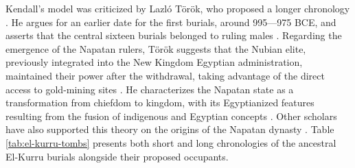 Kendall’s model was criticized by Lazló Török, who proposed a longer chronology \parencite[p.~298-309]{torokEmergenceKingdomKush1995, torokOriginNapatanState1999, torokTwoWorldsFrontier2009}. He argues for an earlier date for the first burials, around 995—975 BCE, and asserts that the central sixteen burials belonged to ruling males \parencite[p.~301]{torokTwoWorldsFrontier2009}. Regarding the emergence of the Napatan rulers, Török suggests that the Nubian elite, previously integrated into the New Kingdom Egyptian administration, maintained their power after the withdrawal, taking advantage of the direct access to gold-mining sites \parencite[p.~111-112]{torokKingdomKushHandbook1997}. He characterizes the Napatan state as a transformation from chiefdom to kingdom, with its Egyptianized features resulting from the fusion of indigenous and Egyptian concepts \parencites{torokKingdomKushHandbook1997, torokTwoWorldsFrontier2009}. Other scholars have also supported this theory on the origins of the Napatan dynasty \parencites{morkotFoundationsKushiteState1995a, morkotEgyptNubiaEgyptian2001}{yellinEgyptianReligionIts1995}{smithNubiaEgyptInteraction1998}{binder10th9thCenturyBC2011}. Table \ref{tab:el-kurru-tombs} presents both short and long chronologies of the ancestral El-Kurru burials alongside their proposed occupants.

